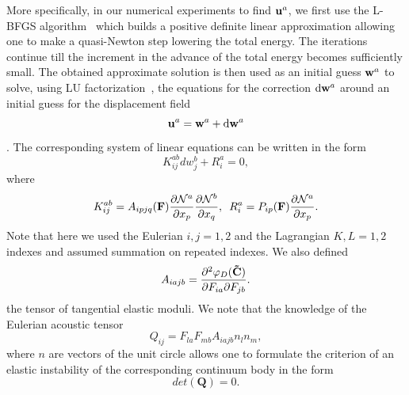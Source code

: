\documentclass[aps,
superscriptaddress,notitlepage]{revtex4-1}
\def\phi{\varphi}
\begin{document}
 More specifically, in our numerical experiments to find ${\bf u}^a$, we first use the L-BFGS algorithm~\cite{Bochkanov2013-lk} which builds a positive definite linear approximation allowing one to make a quasi-Newton step lowering the total energy.   The   iterations continue till  the increment  in the advance of the total energy   becomes sufficiently small. The obtained approximate solution is then   used as an initial guess  ${\bf w}^a$ to solve, using LU factorization~\cite{Sanderson2016-ht,itensor},  the  equations for the correction  $\text{d}{\bf w}^a$
 around   an initial guess for the displacement field $${\bf u}^a={\bf w}^a +  \text{d}{\bf w}^a$$.  The corresponding  system of linear equations can be written in the form
   \begin{equation}
 K^{ab}_{ij}dw_j^b+R_i^a =0,
 \end{equation}
  where 
\begin{equation}
K^{ab}_{ij}= A_{ipjq}({\bf F}) \frac{\partial {\mathcal N}^a}{\partial x_p}\frac{\partial {\mathcal N}^b}{\partial x_q},\,\,\, R^a_i= P_{ip}( {\bf F}) \frac{\partial {\mathcal N}^a}{\partial x_p}.
\end{equation}
Note that here  we used the Eulerian $i,j=1,2$ and the Lagrangian $K,L =1,2$ indexes and assumed summation on repeated indexes.  
We also defined  
 \begin{equation}
 A_{iajb}= \frac{\partial^2\phi_D{({\bf \tilde C} )}}{\partial F_{ia}\partial F_{jb}}.
\end{equation}
 the tensor of tangential elastic moduli. We note that  the knowledge of the Eulerian acoustic tensor  
 \begin{equation}\label{Q}
 {Q}_{ij}=F_{la} F_{mb} A_{iajb} n_l n_m,
 \end{equation}
  where $n$ are vectors of the unit circle allows one to  formulate the criterion of an elastic instability of the corresponding continuum body  in the form \cite{Ogden1997-rf,Grabovsky2014-fb}
  \begin{equation} \label{detQ}
  det (\boldsymbol{{Q}})=0.
  \end{equation}  
\end{document}
